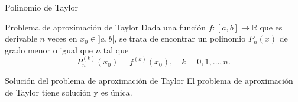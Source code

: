 \begin{frame}{Polinomio de Taylor}
  \begin{alertblock}{Problema de aproximación de Taylor}
    Dada una función $f: [a, b] \to \mathbb{R}$ que es derivable $n$ veces en
    $x_0 \in ]a, b[$, se trata de encontrar un polinomio $P_n(x)$ de grado
    menor o igual que $n$ tal que
    \[
      P_n^{(k)}(x_0) = f^{(k)}(x_0), \quad k = 0, 1, \dots , n.
    \]
  \end{alertblock}
  
  \begin{exampleblock}{Solución del problema de aproximación de Taylor}
    El problema de aproximación de Taylor tiene solución y es única.
  \end{exampleblock}
\end{frame}
